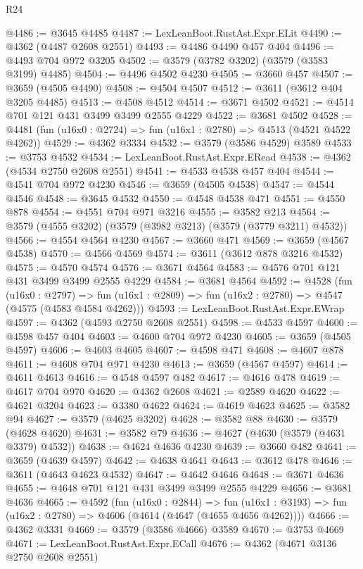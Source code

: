 \begin{lexlean}{R24}
\begin{coremodule}
@4486 := @3645 @4485
@4487 := LexLeanBoot.RustAst.Expr.ELit
@4490 := @4362 (@4487 @2608 @2551)
@4493 := @4486 @4490 @457 @404
@4496 := @4493 @704 @972 @3205
@4502 := @3579 (@3782 @3202) (@3579 (@3583 @3199) @4485)
@4504 := @4496 @4502 @4230
@4505 := @3660 @457
@4507 := @3659 (@4505 @4490)
@4508 := @4504 @4507
@4512 := @3611 (@3612 @404 @3205 @4485)
@4513 := @4508 @4512
@4514 := @3671 @4502
@4521 := @4514 @701 @121 @431 @3499 @3499 @2555 @4229
@4522 := @3681 @4502
@4528 := @4481 (fun (u16x0 : @2724) => fun (u16x1 : @2780) => @4513 (@4521 @4522 @4262))
@4529 := @4362 @3334
@4532 := @3579 (@3586 @4529) @3589
@4533 := @3753 @4532
@4534 := LexLeanBoot.RustAst.Expr.ERead
@4538 := @4362 (@4534 @2750 @2608 @2551)
@4541 := @4533 @4538 @457 @404
@4544 := @4541 @704 @972 @4230
@4546 := @3659 (@4505 @4538)
@4547 := @4544 @4546
@4548 := @3645 @4532
@4550 := @4548 @4538 @471
@4551 := @4550 @878
@4554 := @4551 @704 @971 @3216
@4555 := @3582 @213
@4564 := @3579 (@4555 @3202) (@3579 (@3982 @3213) (@3579 (@3779 @3211) @4532))
@4566 := @4554 @4564 @4230
@4567 := @3660 @471
@4569 := @3659 (@4567 @4538)
@4570 := @4566 @4569
@4574 := @3611 (@3612 @878 @3216 @4532)
@4575 := @4570 @4574
@4576 := @3671 @4564
@4583 := @4576 @701 @121 @431 @3499 @3499 @2555 @4229
@4584 := @3681 @4564
@4592 := @4528
    (fun (u16x0 : @2797) =>
    fun (u16x1 : @2809) => fun (u16x2 : @2780) => @4547 (@4575 (@4583 @4584 @4262)))
@4593 := LexLeanBoot.RustAst.Expr.EWrap
@4597 := @4362 (@4593 @2750 @2608 @2551)
@4598 := @4533 @4597
@4600 := @4598 @457 @404
@4603 := @4600 @704 @972 @4230
@4605 := @3659 (@4505 @4597)
@4606 := @4603 @4605
@4607 := @4598 @471
@4608 := @4607 @878
@4611 := @4608 @704 @971 @4230
@4613 := @3659 (@4567 @4597)
@4614 := @4611 @4613
@4616 := @4548 @4597 @482
@4617 := @4616 @478
@4619 := @4617 @704 @970
@4620 := @4362 @2608
@4621 := @2589 @4620
@4622 := @4621 @3204
@4623 := @3380 @4622
@4624 := @4619 @4623
@4625 := @3582 @94
@4627 := @3579 (@4625 @3202)
@4628 := @3582 @88
@4630 := @3579 (@4628 @4620)
@4631 := @3582 @79
@4636 := @4627 (@4630 (@3579 (@4631 @3379) @4532))
@4638 := @4624 @4636 @4230
@4639 := @3660 @482
@4641 := @3659 (@4639 @4597)
@4642 := @4638 @4641
@4643 := @3612 @478
@4646 := @3611 (@4643 @4623 @4532)
@4647 := @4642 @4646
@4648 := @3671 @4636
@4655 := @4648 @701 @121 @431 @3499 @3499 @2555 @4229
@4656 := @3681 @4636
@4665 := @4592
    (fun (u16x0 : @2844) =>
    fun (u16x1 : @3193) => fun (u16x2 : @2780) => @4606 (@4614 (@4647 (@4655 @4656 @4262))))
@4666 := @4362 @3331
@4669 := @3579 (@3586 @4666) @3589
@4670 := @3753 @4669
@4671 := LexLeanBoot.RustAst.Expr.ECall
@4676 := @4362 (@4671 @3136 @2750 @2608 @2551)

\end{coremodule}
\end{lexlean}
